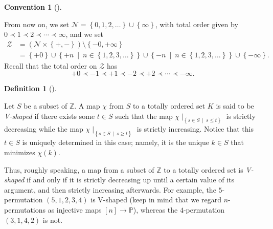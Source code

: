 \documentclass[numbers=enddot,12pt,final,onecolumn,notitlepage]{scrartcl}%
\theoremstyle{definition}
\newtheorem{defi}[theo]{Definition}
\newenvironment{definition}[1][]
{\begin{defi}[#1]\begin{leftbar}}
{\end{leftbar}\end{defi}}
\newtheorem{conv}[theo]{Convention}
\newenvironment{convention}[1][]
{\begin{conv}[#1]\begin{leftbar}}
{\end{leftbar}\end{conv}}
\newenvironment{convention}[1][Convention]{\noindent\textbf{#1.} }{\ \rule{0.5em}{0.5em}}
\newcommand{\ZZ}{\mathbb{Z}}
\begin{document}
\begin{convention}
From now on, we set $\mathcal{N}=\left\{  0,1,2,\ldots\right\}  \cup\left\{
\infty\right\}  $, with total order given by $0\prec1\prec2\prec\cdots
\prec\infty$, and we set
\begin{align*}
\mathcal{Z}  &  =\left(  \mathcal{N}\times\left\{  +,-\right\}  \right)
\setminus\left\{  -0,+\infty\right\} \\
&  =\left\{  +0\right\}  \cup\left\{  +n\ \mid\ n\in\left\{  1,2,3,\ldots
\right\}  \right\}  \cup\left\{  -n\ \mid\ n\in\left\{  1,2,3,\ldots\right\}
\right\}  \cup\left\{  -\infty\right\}  .
\end{align*}
Recall that the total order on $\mathcal{Z}$ has%
\[
+0\prec-1\prec+1\prec-2\prec+2\prec\cdots\prec-\infty.
\]

\end{convention}

\begin{definition}
Let $S$ be a subset of $\mathbb{Z}$.
A map $\chi$ from $S$ to a totally ordered set $K$ is
said to be \textit{V-shaped} if there exists some $t\in S$ such that the map
$\chi\mid_{\left\{  s\in S\ \mid\ s\leq t\right\}  }$ is strictly decreasing
while the map $\chi\mid_{\left\{  s\in S\ \mid\ s\geq t\right\}  }$ is
strictly increasing. Notice that this $t\in S$ is uniquely determined in this
case; namely, it is the unique $k\in S$ that minimizes $\chi\left(  k\right)
$.
\end{definition}

Thus, roughly speaking, a map from a subset of $\ZZ$ to a totally
ordered set is \textit{V-shaped}
if and only if it is strictly decreasing up until a certain value of its
argument, and then strictly increasing afterwards.
For example, the $5$-permutation $\left(5, 1, 2, 3, 4\right)$ is V-shaped
(keep in mind that we regard $n$-permutations as injective maps
$\left[n\right] \to \mathbb{P}$), whereas the $4$-permutation
$\left(3, 1, 4, 2\right)$ is not.
\end{document}
